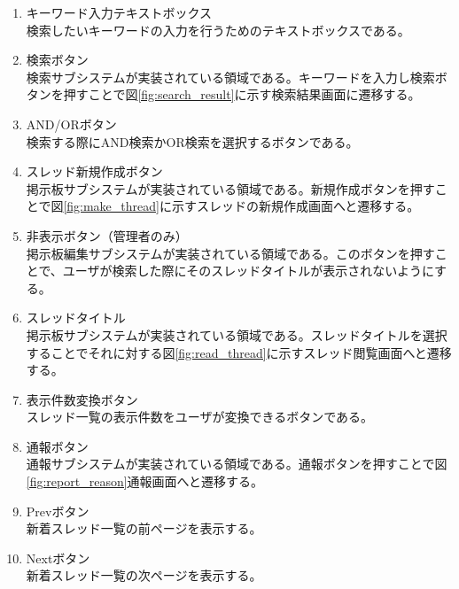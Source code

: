 \documentclass[a4j]{jarticle}
\begin{document}
\begin{enumerate}
  \renewcommand{\labelenumi}{\textcircled{\scriptsize \theenumi}}

\item キーワード入力テキストボックス\\
検索したいキーワードの入力を行うためのテキストボックスである。
\item 検索ボタン\\
検索サブシステムが実装されている領域である。キーワードを入力し検索ボタンを押すことで図\ref{fig:search_result}に示す検索結果画面に遷移する。
\item AND/ORボタン\\
検索する際にAND検索かOR検索を選択するボタンである。
\item スレッド新規作成ボタン\\
掲示板サブシステムが実装されている領域である。新規作成ボタンを押すことで図\ref{fig:make_thread}に示すスレッドの新規作成画面へと遷移する。
\item 非表示ボタン（管理者のみ）\\
掲示板編集サブシステムが実装されている領域である。このボタンを押すことで、ユーザが検索した際にそのスレッドタイトルが表示されないようにする。
\item スレッドタイトル\\
掲示板サブシステムが実装されている領域である。スレッドタイトルを選択することでそれに対する図\ref{fig:read_thread}に示すスレッド閲覧画面へと遷移する。
\item 表示件数変換ボタン\\
スレッド一覧の表示件数をユーザが変換できるボタンである。
\item 通報ボタン\\
通報サブシステムが実装されている領域である。通報ボタンを押すことで図\ref{fig:report_reason}通報画面へと遷移する。
\item Prevボタン\\
新着スレッド一覧の前ページを表示する。
\item Nextボタン\\
新着スレッド一覧の次ページを表示する。

\end{enumerate}
\end{document}
